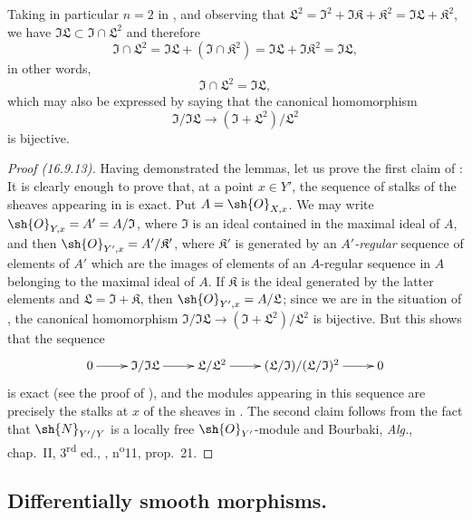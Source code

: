 Taking in particular $n = 2$ in , and observing that $\mathfrak{L}^2 = \mathfrak{I}^2 + \mathfrak{I}\mathfrak{K} + \mathfrak{K}^2 = \mathfrak{I}\mathfrak{L} + \mathfrak{K}^2$, we have $\mathfrak{I}\mathfrak{L} \subset \mathfrak{I} \cap \mathfrak{L}^2$ and therefore
\[
  \mathfrak{I} \cap \mathfrak{L}^2 = \mathfrak{I}\mathfrak{L} + (\mathfrak{I} \cap \mathfrak{K}^2) = \mathfrak{I}\mathfrak{L} + \mathfrak{I}\mathfrak{K}^2 = \mathfrak{I}\mathfrak{L},
\]
in other words, 
\[
  \label{IV.16.9.13.7}
  \mathfrak{I} \cap \mathfrak{L}^2 = \mathfrak{I}\mathfrak{L},
  \tag{16.9.13.7}
\]
which may also be expressed by saying that the canonical homomorphism
\[
  \mathfrak{I}/\mathfrak{I}\mathfrak{L} \to (\mathfrak{I} + \mathfrak{L}^2)/\mathfrak{L}^2
\]
is bijective.

\begin{proof}[Proof (16.9.13)]
Having demonstrated the lemmas, let us prove the first claim of :
It is clearly
enough to prove that, at a point $x \in Y'$, the sequence of stalks of the sheaves appearing in  is exact.
Put $A = \sh{O}_{X,x}$. We may write $\sh{O}_{Y,x} = A' = A/\mathfrak{I}$, where $\mathfrak{I}$ is an ideal contained in the maximal ideal of $A$, and then $\sh{O}_{Y',x} = A'/\mathfrak{K}'$, where $\mathfrak{K}'$ is generated by an \emph{$A'$-regular} sequence of elements of $A'$ which are the images of elements of an $A$-regular sequence in $A$ belonging to the maximal ideal of $A$.
If $\mathfrak{K}$ is the ideal generated by the latter elements and $\mathfrak{L} = \mathfrak{I} + \mathfrak{K}$, then $\sh{O}_{Y',x} = A/\mathfrak{L}$; since we are in the situation of , the canonical homomorphism $\mathfrak{I}/\mathfrak{I}\mathfrak{L} \to (\mathfrak{I} + \mathfrak{L}^2)/\mathfrak{L}^2$ is bijective.
But this shows that the sequence
\[
  \xymatrix{
    0 \ar[r] & \mathfrak{I}/\mathfrak{I}\mathfrak{L} \ar[r] & \mathfrak{L}/\mathfrak{L}^2 \ar[r] &  (\mathfrak{L}/\mathfrak{I})/(\mathfrak{L}/\mathfrak{I})^2 \ar[r] & 0
  }
\]
is exact (see the proof of ), and the modules appearing in this sequence are precisely the stalks at $x$ of the sheaves in .
The second claim follows from the fact that $\sh{N}_{Y'/Y}$ is a locally free $\sh{O}_{Y'}$-module  and Bourbaki, \emph{Alg.}, chap.~II, 3\textsuperscript{rd} ed., , n\textsuperscript{o}11, prop.\ 21.
\end{proof}

\subsection{Differentially smooth morphisms.}
\label{IV.16.10}

